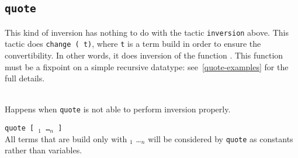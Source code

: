 


\subsection{\tt quote \ident
{}
}

This kind of inversion has nothing to do with the tactic
\texttt{inversion} above. This tactic does \texttt{change (\ident\
  t)}, where \texttt{t} is a term build in order to ensure the
convertibility. In other words, it does inversion of the function
\ident. This function must be a fixpoint on a simple recursive
datatype: see~\ref{quote-examples} for the full details.

\begin{ErrMsgs}
\item {}\\
  Happens when \texttt{quote} is not able to perform inversion properly.
\end{ErrMsgs}

\begin{Variants}
\item \texttt{quote {\ident} [ \ident$_1$ \dots \ident$_n$ ]}\\
  All terms that are build only with \ident$_1$ \dots \ident$_n$ will be
  considered by \texttt{quote} as constants rather than variables.
\end{Variants}


